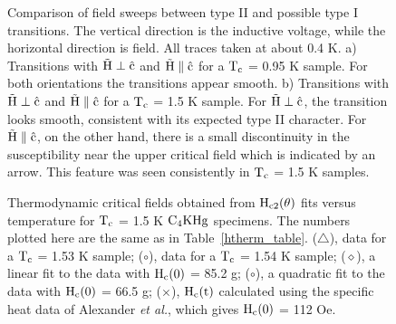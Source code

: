 \begin{figure}
\vspace{15cm}
\caption[Comparison of field sweeps between type II and possible type I
transitions.]{Comparison of field sweeps between type II and  possible type
I transitions.  The vertical direction is the inductive  voltage, while the
horizontal direction  is  field.  All   traces  taken at  about  0.4 K.  a)
Transitions with $\rm \vec{H} \perp
\hat{c}$ and $\rm
\vec{H} \parallel \hat{c}$ for a $\rm T_c$ = 0.95 K sample.  For both
orientations the transitions appear smooth.  b) Transitions with $\rm \vec{H} \perp \hat{c}$
and $\rm
\vec{H} \parallel \hat{c}$ for a $\rm T_c$ = 1.5 K sample.  For $\rm
\vec{H} \perp \hat{c}$, the transition looks smooth, consistent with
its  expected type II  character.  For $\rm  \vec{H} \parallel \hat{c}$, on
the other hand, there is  a small discontinuity  in the susceptibility near
the upper critical field which is indicated by an arrow.   This feature was
seen consistently in $\rm T_c$ = 1.5 K samples.}
\label{transhape}
\end{figure}


\begin{figure}
\vspace{5in}
\caption[Thermodynamic critical fields obtained from $\rm H_{c2}(\theta)$
fits versus temperature.]{Thermodynamic critical  fields obtained from $\rm
H_{c2}(\theta)$ fits versus temperature for $\rm T_c$ = 1.5  K $\rm C_4KHg$
specimens.     The    numbers   plotted   here    are  the   same   as   in
Table~\ref{htherm_table}.  ($\bigtriangleup$), data for a $\rm T_c$  = 1.53 K
sample; ($\circ$),  data for a  $\rm T_c$ = 1.54  K sample;  ($\diamond$), a
linear fit to the data with $\rm H_c(0)$ = 85.2 g; ($\circ$), a quadratic fit
to the data  with $\rm H_c(0)$ = 66.5  g; ($\times$), $\rm H_c(t)$ calculated
using the specific heat data  of  Alexander {\em et  al.},\cite{alexander81}
which gives $\rm H_c(0)$ = 112 Oe.}
\label{hcfig}
\end{figure}

